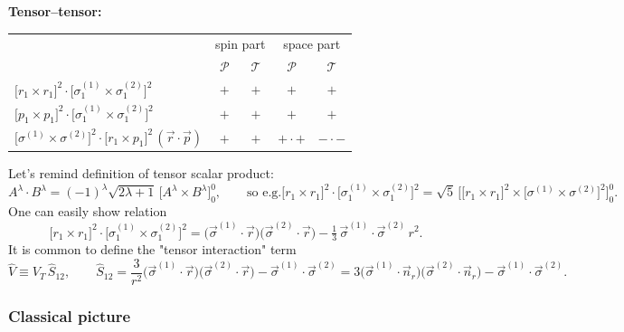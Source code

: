 \documentclass[11pt,a4paper]{article}
\newcommand{\op}[1]{\hat{#1}}
\begin{document}
\textbf{Tensor--tensor:}
\begin{center}
\renewcommand{\arraystretch}{1.3}
\begin{tabular}{l c c c c}
\hline
 & \multicolumn{2}{c}{spin part} & \multicolumn{2}{c}{space part}\\
 & $\mathcal P$ & $\mathcal T$ & $\mathcal P$ & $\mathcal T$ \\
\hline
$\big[r_1\times r_1\big]^2\cdot\big[\sigma^{(1)}_1\times\sigma^{(2)}_1\big]^2$ & $+$ & $+$ & $+$ & $+$ \\
$\big[p_1\times p_1\big]^2\cdot\big[\sigma^{(1)}_1\times\sigma^{(2)}_1\big]^2$ & $+$ & $+$ & $+$ & $+$ \\
$\big[\sigma^{(1)}\times\sigma^{(2)}\big]^2\cdot\big[r_1\times p_1\big]^2\,(\vec r\cdot\vec p)$ & $+$ & $+$ & $+$\,$\cdot$\,$+$ & $-$\,$\cdot$\,$-$ \\
\hline
\end{tabular}
\end{center}
Let's remind definition of tensor scalar product:
\[
A^\lambda\cdot B^\lambda=(-1)^\lambda\sqrt{2\lambda+1}\,\big[A^\lambda\times B^\lambda\big]^0_0,
\qquad
\text{so e.g.}
\big[r_1\times r_1\big]^2\cdot\big[\sigma^{(1)}_1\times\sigma^{(2)}_1\big]^2
=\sqrt5\,\Big[\big[r_1\times r_1\big]^2\times\big[\sigma^{(1)}\times\sigma^{(2)}\big]^2\Big]^0_0 .
\]
One can easily show relation
\[
\big[r_1\times r_1\big]^2\cdot\big[\sigma^{(1)}_1\times\sigma^{(2)}_1\big]^2
=\big(\vec\sigma^{(1)}\!\cdot\vec r\big)\big(\vec\sigma^{(2)}\!\cdot\vec r\big)
-\tfrac13\,\vec\sigma^{(1)}\!\cdot\vec\sigma^{(2)}\,r^2 .
\]
It is common to define the "tensor interaction" term
\[
\op V\equiv V_T\,\op S_{12},
\qquad
\op S_{12}=\frac{3}{r^2}\big(\vec\sigma^{(1)}\!\cdot\vec r\big)\big(\vec\sigma^{(2)}\!\cdot\vec r\big)
-\vec\sigma^{(1)}\!\cdot\vec\sigma^{(2)}
=3\big(\vec\sigma^{(1)}\!\cdot\vec n_r\big)\big(\vec\sigma^{(2)}\!\cdot\vec n_r\big)
-\vec\sigma^{(1)}\!\cdot\vec\sigma^{(2)} .
\]

\subsubsection*{Classical picture}
\end{document}
